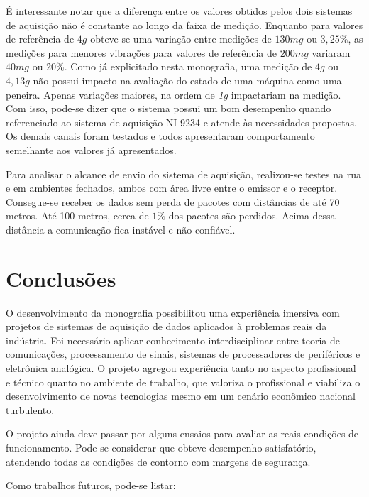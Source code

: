 \documentclass[
	12pt,				%
	openright,			%
	twoside,			%
	a4paper,			%
	english,			%
	french,				%
	spanish,			%
	brazil,				%
	]{abntex2}
\begin{document}
		É interessante notar que a diferença entre os valores obtidos pelos dois sistemas de aquisição não é constante ao longo da faixa de medição. Enquanto para valores de referência de $4g$ obteve-se uma variação entre medições de $130mg$ ou $3,25\%$, as medições para menores vibrações para valores de referência de $200mg$ variaram $40mg$ ou $20\%$. Como já explicitado nesta monografia, uma medição de $4g$ ou $4,13g$ não possui impacto na avaliação do estado de uma máquina como uma peneira. Apenas variações maiores, na ordem de \textit{1g} impactariam na medição. Com isso, pode-se dizer que o sistema possui um bom desempenho quando referenciado ao sistema de aquisição NI-9234 e atende às necessidades propostas. Os demais canais foram testados e todos apresentaram comportamento semelhante aos valores já apresentados.

		Para analisar o alcance de envio do sistema de aquisição, realizou-se testes na rua e em ambientes fechados, ambos com área livre entre o emissor e o receptor. Consegue-se receber os dados sem perda de pacotes com distâncias de até 70 metros. Até 100 metros, cerca de $1\%$ dos pacotes são perdidos. Acima dessa distância a comunicação fica instável e não confiável.


\chapter{Conclusões}

	O desenvolvimento da monografia possibilitou uma experiência imersiva com
	projetos de sistemas de aquisição de dados aplicados à problemas
	reais da indústria. Foi necessário aplicar conhecimento
	interdisciplinar entre teoria de comunicações, processamento de
	sinais, sistemas de processadores de periféricos e eletrônica
	analógica. O projeto agregou experiência tanto no aspecto
	profissional e técnico quanto no ambiente de trabalho, que valoriza
	o profissional e viabiliza o desenvolvimento de novas tecnologias
	mesmo em um cenário econômico nacional turbulento.

	O projeto ainda deve passar por alguns ensaios para avaliar as reais
	condições de funcionamento. Pode-se considerar que obteve desempenho satisfatório, atendendo
	todas as condições de contorno com margens de segurança.
	
	Como trabalhos futuros, pode-se listar:
	
\end{document}

